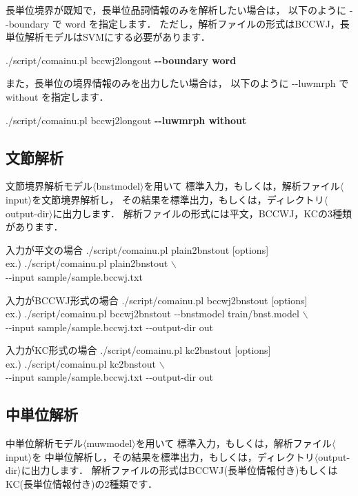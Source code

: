 \documentclass[titlepage]{jarticle}
\begin{document}
長単位境界が既知で，長単位品詞情報のみを解析したい場合は，
以下のように {-}{-}boundary で word を指定します．
ただし，解析ファイルの形式はBCCWJ，長単位解析モデルはSVMにする必要があります．
\begin{screen}
./script/comainu.pl bccwj2longout \textbf{{-}{-}boundary word}
\end{screen}
また，長単位の境界情報のみを出力したい場合は，
以下のように {-}{-}luwmrph で without を指定します．
\begin{screen}
./script/comainu.pl bccwj2longout \textbf{{-}{-}luwmrph without}
\end{screen}


\subsection{文節解析}\label{bnst_cui}
文節境界解析モデル$\langle$bnstmodel$\rangle$を用いて
標準入力，もしくは，解析ファイル$\langle$input$\rangle$を文節境界解析し，
その結果を標準出力，もしくは，ディレクトリ$\langle$output-dir$\rangle$に出力します．
解析ファイルの形式には平文，BCCWJ，KCの3種類があります．

\begin{itembox}[l]{入力が平文の場合}
./script/comainu.pl plain2bnstout [options] \\
  ex.) ./script/comainu.pl plain2bnstout $\backslash$ \\
\hspace{10mm} {-}{-}input sample/sample.bccwj.txt
\end{itembox}

\begin{itembox}[l]{入力がBCCWJ形式の場合}
./script/comainu.pl bccwj2bnstout [options] \\
ex.) ./script/comainu.pl bccwj2bnstout {-}{-}bnstmodel train/bnst.model $\backslash$ \\
\hspace{10mm} {-}{-}input sample/sample.bccwj.txt {-}{-}output-dir out
\end{itembox}

 \begin{itembox}[l]{入力がKC形式の場合}
./script/comainu.pl kc2bnstout [options] \\
  ex.) ./script/comainu.pl kc2bnstout $\backslash$ \\
\hspace{10mm} {-}{-}input sample/sample.bccwj.txt {-}{-}output-dir out
\end{itembox}


\subsection{中単位解析}\label{mid_cui}
中単位解析モデル$\langle$muwmodel$\rangle$を用いて
標準入力，もしくは，解析ファイル$\langle$input$\rangle$を
中単位解析し，その結果を標準出力，もしくは，ディレクトリ$\langle$output-dir$\rangle$に出力します．
解析ファイルの形式はBCCWJ(長単位情報付き)もしくはKC(長単位情報付き)の2種類です．
\end{document}
